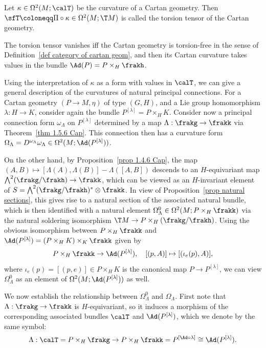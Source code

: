 \begin{defn}
    Let $\kappa\in\Omega^2(M;\calT)$ be the curvature of a Cartan geometry. Then $\sfT\coloneqq \Pi\circ\kappa\in\Omega^2(M;\T M)$ is called the torsion tensor of the Cartan geometry.

    The torsion tensor vanishes iff the Cartan geometry is torsion-free in the sense of Definition~\ref{def category of cartan geom}, and then its Cartan curvature takes values in the bundle $\Ad(P)=P\times_H \frakh$.
\end{defn}

Using the interpretation of $\kappa$ as a form with values in $\calT$, we can give a general description of the curvatures of natural principal connections. For a Cartan geometry $(P\to M,\eta)$ of type $(G,H)$, and a Lie group homomorphism $\lambda:H\to K$, consider again the bundle $P^{[\lambda]}=P\times_H K$. Consider now a principal connection form $\omega_\Lambda$ on $P^{[\lambda]}$ determined by a map $\Lambda:\frakg\to\frakk$ via Theorem~\ref{thm 1.5.6 Cap}. This connection then has a curvature form $\Omega_\Lambda=D^{\omega_\Lambda}\omega_\Lambda\in\Omega^2(M;\Ad(P^{[\lambda]}))$.

On the other hand, by Proposition~\ref{prop 1.4.6 Cap}, the map $(A,B)\mapsto [\Lambda(A),\Lambda(B)]-\Lambda([A,B])$ descends to an $H$-equivariant map $\bigwedge^2(\frakg\slash\frakh)\to \frakk$, which can be viewed as an $H$-invariant element of $S=\bigwedge^2(\frakg\slash\frakh)^\ast\otimes\frakk$. In view of Proposition~\ref{prop natural sections}, this gives rise to a natural section of the associated natural bundle, which is then identified with a natural element $\Omega^0_\Lambda\in\Omega^2(M;P\times_H \frakk)$ via the natural soldering isomorphism $\T M\to P\times_H(\frakg\slash\frakh)$.  Using the obvious isomorphism between $P\times_H \frakk$ and $\Ad(P^{[\lambda]})=(P\times_H K)\times_K\frakk$ given by 
\[P\times_H \frakk\to \Ad(P^{[\lambda]}),\quad [(p,A)]\mapsto [(\iota_e(p),A)],\]
where $\iota_e(p)=[(p,e)]\in P\times_H K$ is the canonical map $P\to P^{[\lambda]}$, we can view $\Omega^0_\Lambda$ as an element of $\Omega^2(M;\Ad(P^{[\lambda]}))$ as well.

We now establish the relationship between $\Omega^0_\Lambda$ and $\Omega_\Lambda$. First note that $\Lambda:\frakg\to \frakk$ is $H$-equivariant, so it induces a morphism of the corresponding associated bundles $\calT$ and $\Ad(P^{[\lambda]})$, which we denote by the same symbol:
\[\Lambda: \calT=P\times_H\frakg\to P\times_H \frakk =P^{[\Ad\circ \lambda]}\cong \Ad(P^{[\lambda]}).\]


